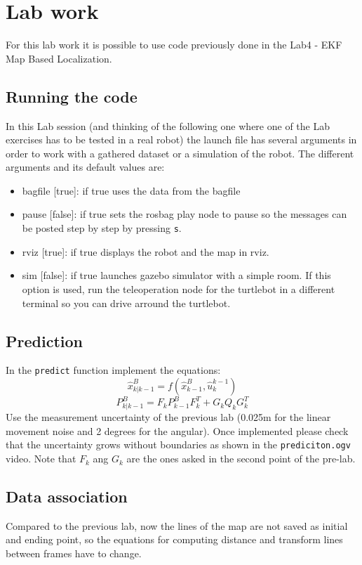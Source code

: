 \documentclass[a4paper,10pt]{article}
\begin{document}
\section{Lab work}
For this lab work it is possible to use code previously done in the Lab4 - EKF Map Based Localization.


\subsection{Running the code}
In this Lab session (and thinking of the following one where one of the Lab exercises has to be tested in a real robot) the launch file has several arguments in order to work with a gathered dataset or a simulation of the robot. The different arguments and its default values are:
\begin{itemize}
	\item bagfile [true]: if true uses the data from the bagfile
	\item pause [false]: if true sets the rosbag play node to pause so the messages can be posted step by step by pressing \texttt{s}.
	\item rviz [true]: if true displays the robot and the map in rviz.
	\item sim [false]: if true launches gazebo simulator with a simple room. If this option is used, run the teleoperation node for the turtlebot in a different terminal so you can drive arround the turtlebot.
\end{itemize} 

\subsection{Prediction}
In the \texttt{predict} function implement the equations:
\begin{equation}
	\widehat{x}_{k|k-1}^B = f\left(\widehat{x}_{k-1}^B,\widehat{u}_k^{k-1} \right)
\end{equation}
\begin{equation}
	P_{k|k-1}^B = F_k P_{k-1}^B F_k^T + G_k Q_k G_k^T
\end{equation}
Use the measurement uncertainty of the previous lab (0.025m for the linear movement noise and 2 degrees for the angular). Once implemented please check that the uncertainty grows without boundaries as shown in the \texttt{prediciton.ogv} video. Note that $F_k$ ang $G_k$ are the ones asked in the second point of the pre-lab.

\subsection{Data association}
Compared to the previous lab, now the lines of the map are not saved as initial and ending point, so the equations for computing distance and transform lines between frames have to change.
\end{document}
